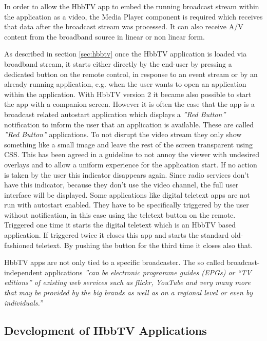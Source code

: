 In order to allow the HbbTV app to embed the running broadcast stream within the application as a video, the Media Player component is required which receives that data after the broadcast stream was processed. It can also receive A/V content from the broadband source in linear or non linear form.

As described in section \ref{sec:hbbtv} once the HbbTV application is loaded via broadband stream, it starts either directly by the end-user by pressing a dedicated button on the remote control, in response to an event stream or by an already running application, e.g. when the user wants to open an application within the application. With HbbTV version 2 it became also possible to start the app with a companion screen. However it is often the case that the app is a broadcast related autostart application which displays a \textit{''Red Button''} notification to inform the user that an application is available. These are called \textit{''Red Button''} applications. To not disrupt the video stream they only show something like a small image and leave the rest of the screen transparent using CSS. This has been agreed in a guideline to not annoy the viewer with undesired overlays and to allow a uniform experience for the application start. If no action is taken by the user this indicator disappears again. Since radio services don't have this indicator, because they don't use the video channel, the full user interface will be displayed. Some applications like digital teletext apps are not run with autostart enabled. They have to be specifically triggered by the user without notification, in this case using the teletext button on the remote. Triggered one time it starts the digital teletext which is an HbbTV based application. If triggered twice it closes this app and starts the standard old-fashioned teletext. By pushing the button for the third time it closes also that.

HbbTV apps are not only tied to a specific broadcaster. The so called broadcast-independent applications \textit{''can be electronic programme guides (EPGs) or “TV editions” of existing web services such as flickr, YouTube and very many more that may be provided by the big brands as well as on a regional level or even by individuals.''}\cite{biapps}

\subsection{Development of HbbTV Applications\label{sec:devofhbbtv}}

